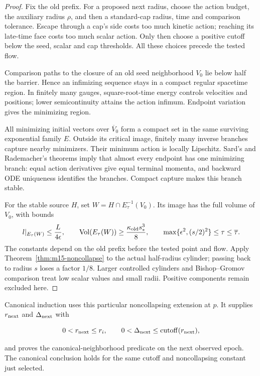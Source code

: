 \begin{proof}
Fix the old prefix. For a proposed next radius, choose the action budget,
the auxiliary radius $\rho$, and then a standard-cap radius, time and
comparison tolerance. Escape through a cap's side costs too much kinetic
action; reaching its late-time face costs too much scalar action. Only
then choose a positive cutoff below the seed, scalar and cap thresholds.
All these choices precede the tested flow.

Comparison paths to the closure of an old seed neighborhood $V_0$ lie
below half the barrier. Hence an infimizing sequence stays in a compact
regular spacetime region. In finitely many gauges, square-root-time energy
controls velocities and positions; lower semicontinuity attains the action
infimum. Endpoint variation gives the minimizing region.

All minimizing initial vectors over $\overline V_0$ form a compact set
in the same surviving exponential family $E$. Outside its critical image,
finitely many inverse branches capture nearby minimizers. Their minimum
action is locally Lipschitz. Sard's and Rademacher's theorems imply that
almost every endpoint has one minimizing branch: equal action derivatives
give equal terminal momenta, and backward ODE uniqueness identifies the
branches. Compact capture makes this branch stable.

For the stable source $H$, set $W=H\cap E_\tau^{-1}(V_0)$. Its image
has the full volume of $V_0$, with bounds
\[
 l|_{E_\tau(W)}\leq \frac{L}{4\epsilon},\qquad
 \operatorname{Vol}(E_\tau(W))\geq
 \frac{\kappa_{\rm old}s_*^3}{8},\qquad
 \max\{\epsilon^2,(s/2)^2\}\leq\tau\leq\overline\tau.
\]
The constants depend on the old prefix before the tested point and flow.
Apply Theorem~\ref{thm:m15-noncollapse} to the actual half-radius cylinder;
passing back to radius $s$ loses a factor $1/8$. Larger controlled cylinders
and Bishop--Gromov comparison treat low scalar values and small radii.
Positive components remain excluded here.
\end{proof}

\begin{theorem}
\label{thm:global-canonical}
Canonical induction uses this particular noncollapsing extension at $p$.
It supplies $r_{\rm next}$ and
$\Delta_{\rm next}$ with

\[
  0<r_{\rm next}\leq r_i,\qquad
  0<\Delta_{\rm next}\leq\operatorname{cutoff}(r_{\rm next}),
\]

and proves the canonical-neighborhood predicate on the next observed epoch.
The canonical conclusion holds for the same cutoff and noncollapsing
constant just selected.
\end{theorem}


